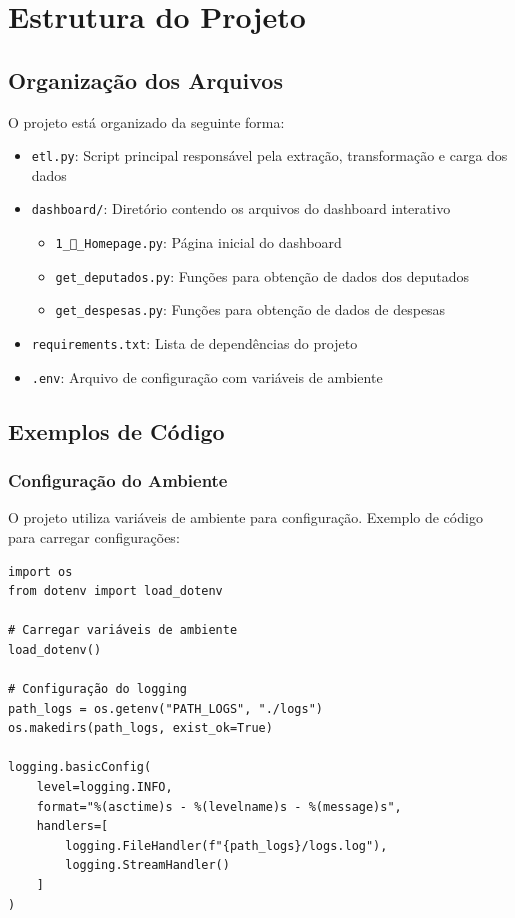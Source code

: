 \documentclass[12pt,a4paper]{article}
\begin{document}
\section{Estrutura do Projeto}
\subsection{Organização dos Arquivos}
O projeto está organizado da seguinte forma:

\begin{itemize}
    \item \texttt{etl.py}: Script principal responsável pela extração, transformação e carga dos dados
    \item \texttt{dashboard/}: Diretório contendo os arquivos do dashboard interativo
    \begin{itemize}
        \item \texttt{1\_📄\_Homepage.py}: Página inicial do dashboard
        \item \texttt{get\_deputados.py}: Funções para obtenção de dados dos deputados
        \item \texttt{get\_despesas.py}: Funções para obtenção de dados de despesas
    \end{itemize}
    \item \texttt{requirements.txt}: Lista de dependências do projeto
    \item \texttt{.env}: Arquivo de configuração com variáveis de ambiente
\end{itemize}

\subsection{Exemplos de Código}
\subsubsection{Configuração do Ambiente}
O projeto utiliza variáveis de ambiente para configuração. Exemplo de código para carregar configurações:

\begin{lstlisting}
import os
from dotenv import load_dotenv

# Carregar variáveis de ambiente
load_dotenv()

# Configuração do logging
path_logs = os.getenv("PATH_LOGS", "./logs")
os.makedirs(path_logs, exist_ok=True)

logging.basicConfig(
    level=logging.INFO,
    format="%(asctime)s - %(levelname)s - %(message)s",
    handlers=[
        logging.FileHandler(f"{path_logs}/logs.log"),
        logging.StreamHandler()
    ]
)
\end{lstlisting}
\end{document}
